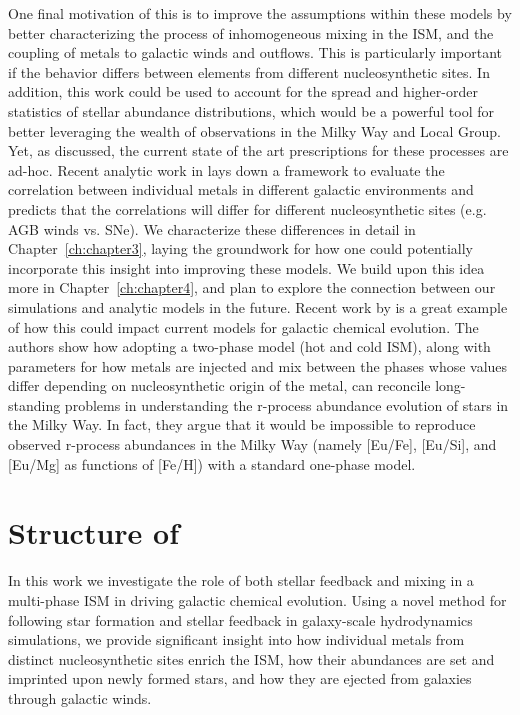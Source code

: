 One final motivation of this \dissertation is to improve the assumptions within these models by better characterizing the process of inhomogeneous mixing in the ISM, and the coupling of metals to galactic winds and outflows. This is particularly important if the behavior differs between elements from different nucleosynthetic sites. In addition, this work could be used to account for the spread and higher-order statistics of stellar abundance distributions, which would be a powerful tool for better leveraging the wealth of observations in the Milky Way and Local Group. Yet, as discussed, the current state of the art prescriptions for these processes are ad-hoc. Recent analytic work in \cite{KrumholzTing2018} lays down a framework to evaluate the correlation between individual metals in different galactic environments and predicts that the correlations will differ for different nucleosynthetic sites (e.g. AGB winds vs. SNe). We characterize these differences in detail in Chapter~\ref{ch:chapter3}, laying the groundwork for how one could potentially incorporate this insight into improving these models. We build upon this idea more in Chapter~\ref{ch:chapter4}, and plan to explore the connection between our simulations and analytic models in the future. Recent work by \cite{SchonrichWeinberg2019} is a great example of how this could impact current models for galactic chemical evolution. The authors show how adopting a two-phase model (hot and cold ISM), along with parameters for how metals are injected and mix between the phases whose values differ depending on nucleosynthetic origin of the metal, can reconcile long-standing problems in understanding the r-process abundance evolution of stars in the Milky Way. In fact, they argue that it would be impossible to reproduce observed r-process abundances in the Milky Way (namely [Eu/Fe], [Eu/Si], and [Eu/Mg] as functions of [Fe/H]) with a standard one-phase model.


\section{Structure of \dissertation}\label{intro:sec:structure}
\label{intro:sec:structure}

In this work we investigate the role of both stellar feedback and mixing in a multi-phase ISM in driving galactic chemical evolution. Using a novel method for following star formation and stellar feedback in galaxy-scale hydrodynamics simulations, we provide significant insight into how individual metals from distinct nucleosynthetic sites enrich the ISM, how their abundances are set and imprinted upon newly formed stars, and how they are ejected from galaxies through galactic winds.

